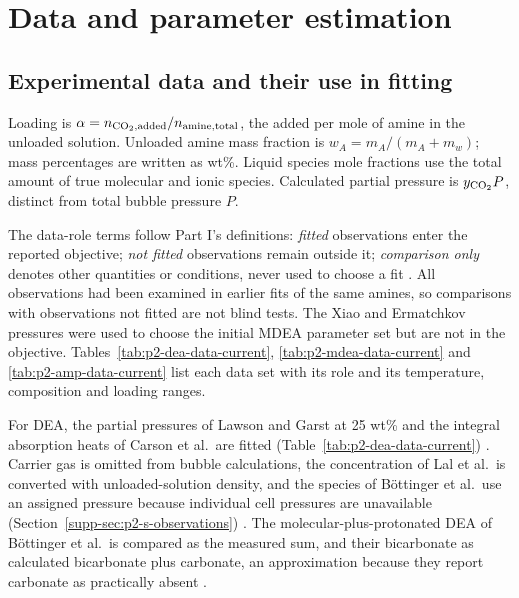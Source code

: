\section{Data and parameter estimation}\label{sec:p2-methods}
\subsection{Experimental data and their use in fitting}\label{sec:p2-data}
Loading is $\alpha=n_{\COtwo,\mathrm{added}}/n_{\mathrm{amine,total}}$, the added \COtwo per mole of amine in the unloaded solution.
Unloaded amine mass fraction is $w_A=m_A/(m_A+m_w)$; mass percentages are written as wt\%.
Liquid species mole fractions use the total amount of true molecular and ionic species.
Calculated \COtwo partial pressure is $y_{\COtwo}P$, distinct from total bubble pressure $P$.

The data-role terms follow Part I's definitions: \emph{fitted} observations enter the reported objective; \emph{not fitted} observations remain outside it; \emph{comparison only} denotes other quantities or conditions, never used to choose a fit \cite[Sect.~3]{PolleyPartI}.
All observations had been examined in earlier fits of the same amines, so comparisons with observations not fitted are not blind tests.
The Xiao and Ermatchkov pressures were used to choose the initial MDEA parameter set but are not in the objective.
Tables~\ref{tab:p2-dea-data-current}, \ref{tab:p2-mdea-data-current} and \ref{tab:p2-amp-data-current} list each data set with its role and its temperature, composition and loading ranges.



For DEA, the \COtwo partial pressures of Lawson and Garst at 25 wt\% and the integral absorption heats of Carson et al.\ are fitted (Table~\ref{tab:p2-dea-data-current}) \cite{lawsonGasSweeteningData1976,carsonEnthalpySolutionCarbon2000}.
Carrier gas is omitted from bubble calculations, the concentration of Lal et al.\ is converted with unloaded-solution density, and the species of B\"ottinger et al.\ use an assigned pressure because individual cell pressures are unavailable (Section~\ref{supp-sec:p2-s-observations}) \cite{lalSolubilityH2SCO21985,Bottinger2008}.
The molecular-plus-protonated DEA of B\"ottinger et al.\ is compared as the measured sum, and their bicarbonate as calculated bicarbonate plus carbonate, an approximation because they report carbonate as practically absent \cite[Sect.~3]{Bottinger2008}.

